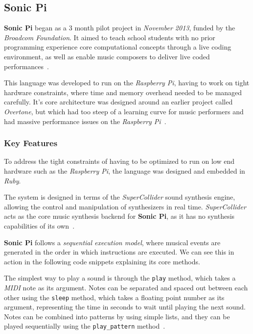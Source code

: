 \subsection{Sonic Pi}\label{subsec:sonic-pi}

\textbf{Sonic Pi} began as a 3 month pilot project in \textit{November 2013}, funded by the \textit{Broadcom
Foundation}.
It aimed to teach school students with no prior programming experience core computational concepts through a live coding
environment, as well as enable music composers to deliver live coded performances~\cite{Aaron_Blackwell_2013,
Aaron_2016}.

This language was developed to run on the \textit{Raspberry Pi}, having to work on tight hardware constraints, where
time and memory overhead needed to be managed carefully.
It's core architecture was designed around an earlier project called \textit{Overtone}, but which had too steep of a
learning curve for music performers and had massive performance issues on the \textit{Raspberry Pi}~\cite{Aaron_2016}.


\subsubsection{Key Features}

To address the tight constraints of having to be optimized to run on low end hardware such as the \textit{Raspberry Pi},
the language was designed and embedded in \textit{Ruby}.

The system is designed in terms of the \textit{SuperCollider} sound synthesis engine, allowing the control
and manipulation of synthesizers in real time.
\textit{SuperCollider} acts as the core music synthesis backend for \textbf{Sonic Pi}, as it has no synthesis
capabilities of its own~\cite{Aaron_Blackwell_2013}.

\textbf{Sonic Pi} follows a \textit{sequential execution model}, where musical events are generated in the order in
which instructions are executed.
We can see this in action in the following code snippets explaining its core methods.

The simplest way to play a sound is through the \texttt{play} method, which takes a \textit{MIDI} note as its argument.
Notes can be separated and spaced out between each other using the \texttt{sleep} method, which takes a floating point
number as its argument, representing the time in seconds to wait until playing the next sound.
Notes can be combined into patterns by using simple lists, and they can be played sequentially using the
\texttt{play\_pattern} method~\cite{Aaron_Blackwell_2013}.

